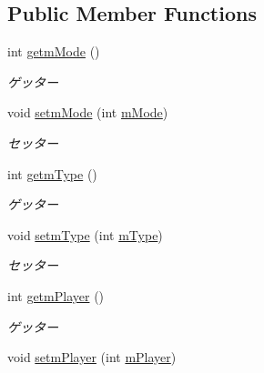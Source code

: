 \subsection*{Public Member Functions}
\begin{DoxyCompactItemize}
\item 
int \hyperlink{classjp_1_1gr_1_1java__conf_1_1yuta__yoshinaga_1_1reversi_1_1model_1_1_reversi_setting_a692b0ca2802f35aa7404c38bfe2fdb02}{getm\+Mode} ()
\begin{DoxyCompactList}\small\item\em ゲッター \end{DoxyCompactList}\item 
void \hyperlink{classjp_1_1gr_1_1java__conf_1_1yuta__yoshinaga_1_1reversi_1_1model_1_1_reversi_setting_a2838366ac19c8b092acbc498edbc06c4}{setm\+Mode} (int \hyperlink{classjp_1_1gr_1_1java__conf_1_1yuta__yoshinaga_1_1reversi_1_1model_1_1_reversi_setting_a8e0e524903804ef8d0d22c3ed1600615}{m\+Mode})
\begin{DoxyCompactList}\small\item\em セッター \end{DoxyCompactList}\item 
int \hyperlink{classjp_1_1gr_1_1java__conf_1_1yuta__yoshinaga_1_1reversi_1_1model_1_1_reversi_setting_a4bdf61298cd8918aa2c7f4b8d217b8ef}{getm\+Type} ()
\begin{DoxyCompactList}\small\item\em ゲッター \end{DoxyCompactList}\item 
void \hyperlink{classjp_1_1gr_1_1java__conf_1_1yuta__yoshinaga_1_1reversi_1_1model_1_1_reversi_setting_a3c55d07908d395a2d0c23cfea9733804}{setm\+Type} (int \hyperlink{classjp_1_1gr_1_1java__conf_1_1yuta__yoshinaga_1_1reversi_1_1model_1_1_reversi_setting_aa013af59007a52b83d2eeb6023719615}{m\+Type})
\begin{DoxyCompactList}\small\item\em セッター \end{DoxyCompactList}\item 
int \hyperlink{classjp_1_1gr_1_1java__conf_1_1yuta__yoshinaga_1_1reversi_1_1model_1_1_reversi_setting_ad6a3e06364081f7f81d88e0f2e35d45c}{getm\+Player} ()
\begin{DoxyCompactList}\small\item\em ゲッター \end{DoxyCompactList}\item 
void \hyperlink{classjp_1_1gr_1_1java__conf_1_1yuta__yoshinaga_1_1reversi_1_1model_1_1_reversi_setting_a092acf6b08576f10b48610ab6eddf0bd}{setm\+Player} (int \hyperlink{classjp_1_1gr_1_1java__conf_1_1yuta__yoshinaga_1_1reversi_1_1model_1_1_reversi_setting_a03f6bbc5bac7023190f5100aabb63816}{m\+Player})

\end{DoxyCompactItemize}
